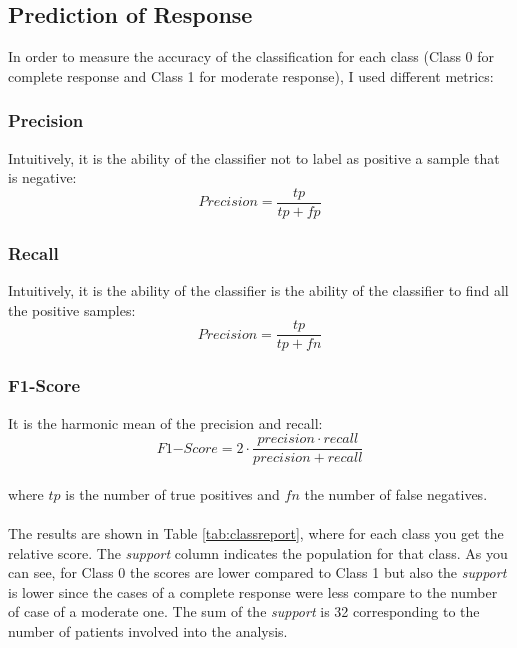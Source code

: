 \documentclass{standalone}
\begin{document}
\subsection{Prediction of Response}

In order to measure the accuracy of the classification for each class (Class 0 for complete response and Class 1 for moderate response), I used different metrics: 
\subsubsection{Precision}
Intuitively, it is the ability of the classifier not to label as positive a sample that is negative: 
\begin{equation*}
    Precision = \frac{tp}{tp + fp}
\end{equation*}

\subsubsection{Recall}
Intuitively, it is the ability of the classifier is the ability of the classifier to find all the positive samples: 
\begin{equation*}
    Precision = \frac{tp}{tp + fn}
\end{equation*}

\subsubsection{F1-Score}
It is the harmonic mean of the precision and recall: 
\begin{equation*}
    F1\mathtt{-}Score = 2 \cdot \frac{precision \cdot recall}{precision + recall}
\end{equation*}
\\

where $tp$ is the number of true positives and $fn$ the number of false negatives.
\\
\\
The results are shown in Table \ref{tab:classreport}, where for each class you get the relative score.
The \textit{support} column indicates the population for that class.
As you can see, for Class 0 the scores are lower compared to Class 1 but also the \textit{support} is lower since the cases of a complete response were less compare to the number of case of a moderate one.
The sum of the \textit{support} is 32 corresponding to the number of patients involved into the analysis.
\end{document}
